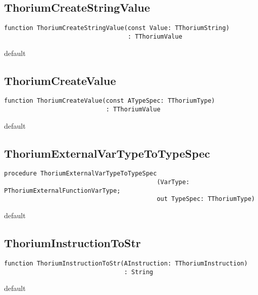 \subsection{ThoriumCreateStringValue}
\label{thoriumcorepkg:thorium:thoriumcreatestringvalue}
\begin{FPCList}
\Declaration 

\begin{verbatim}
function ThoriumCreateStringValue(const Value: TThoriumString)
                                  : TThoriumValue
\end{verbatim}
\Visibility
default
\end{FPCList}
\subsection{ThoriumCreateValue}
\label{thoriumcorepkg:thorium:thoriumcreatevalue}
\begin{FPCList}
\Declaration 

\begin{verbatim}
function ThoriumCreateValue(const ATypeSpec: TThoriumType)
                            : TThoriumValue
\end{verbatim}
\Visibility
default
\end{FPCList}
\subsection{ThoriumExternalVarTypeToTypeSpec}
\label{thoriumcorepkg:thorium:thoriumexternalvartypetotypespec}
\begin{FPCList}
\Declaration 

\begin{verbatim}
procedure ThoriumExternalVarTypeToTypeSpec
                                          (VarType: PThoriumExternalFunctionVarType;
                                          out TypeSpec: TThoriumType)
\end{verbatim}
\Visibility
default
\end{FPCList}
\subsection{ThoriumInstructionToStr}
\label{thoriumcorepkg:thorium:thoriuminstructiontostr}
\begin{FPCList}
\Declaration 

\begin{verbatim}
function ThoriumInstructionToStr(AInstruction: TThoriumInstruction)
                                 : String
\end{verbatim}
\Visibility
default
\end{FPCList}
